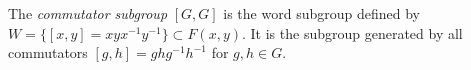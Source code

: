 The \textit{commutator subgroup} $[G,G]$ is the word subgroup defined by $W = \{[x,y] = xyx^{-1}y^{-1}\} \subset F(x,y)$. It is the subgroup generated by all commutators $[g,h] = ghg^{-1}h^{-1}$ for $g,h \in G$.
